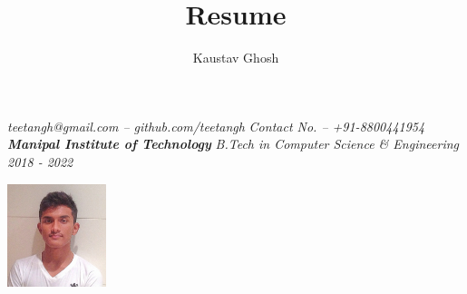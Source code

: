 \documentclass{article}
\makeatletter
\renewcommand{\maketitle}{
    \begin{flushleft}        
        {\huge\rmfamily
        \theauthor}\newline
        \vspace{0.1em}
        \textit{teetangh@gmail.com -- github.com/teetangh}\newline
        \textit{Contact No. -- +91-8800441954}\newline
        \textbf{\emph{Manipal Institute of Technology}}\newline
        \textit{B.Tech in Computer Science \& Engineering}
        \textit{2018 - 2022}\newline
    \end{flushleft}

}
\makeatother
\begin{document}
    


\begin{multicols}{2}
    \title{Resume}
        \author{Kaustav Ghosh}
    \maketitle
    \begin{flushright}
        \includegraphics[height=3cm]{kaustav.jpeg}
    \end{flushright}
\end{multicols}
\end{document}
